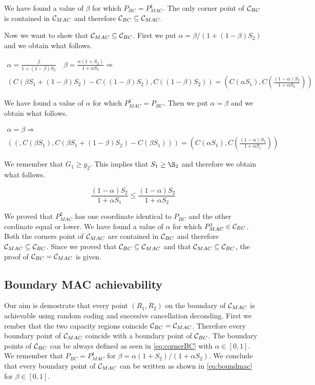 We have found a value of $\beta$ for which $P_{BC} = P_{MAC}^1$. The only corner point of $\mathcal{C}_{BC}$ is contained in $\mathcal{C}_{MAC}$ and therefore $\mathcal{C}_{BC} \subseteq \mathcal{C}_{MAC}$.

Now we want to show that $\mathcal{C}_{MAC} \subseteq \mathcal{C}_{BC}$. First we put $\alpha = \beta / (1+(1-\beta)S_2)$ and we obtain what follows.

\begin{gather*}
	\alpha = \frac{\beta}{1+ (1-\beta) S_2} \quad \beta = \frac{\alpha(1+S_2)}{1+\alpha S_2}  \Rightarrow \\
	\left( C (\beta S_1 + (1-\beta)S_2) - C((1-\beta)S_2) , C \left( (1-\beta)S_2 \right) \right)
	= \left( C(\alpha S_1) , C \left( \frac{(1-\alpha)S_2}{1+\alpha S_2} \right) \right)
\end{gather*}

We have found a value of $\alpha$ for which $P_{MAC}^1 = P_{BC}$. Then we put $\alpha = \beta$ and we obtain what follows.

\begin{gather*}
	\alpha = \beta \Rightarrow \\
	(\left( , C \left(\beta S_1 \right), C (\beta S_1 + (1-\beta)S_2) - C(\beta S_1) \right)) =  \left( C \left(\alpha S_1 \right), C \left( \frac{(1-\alpha)S_2}{1 + \alpha S_1}\right) \right)
\end{gather*}

We remember that $G_1 \geq g_2$. This implies that $S_1 \geq \S_2$ and therefore we obtain what follows.

\begin{equation*}
	\frac{(1-\alpha)S_2}{1 + \alpha S_1} \leq \frac{(1-\alpha)S_2}{1 + \alpha S_2}
\end{equation*}

We proved that $P_{MAC}^2$ has one coordinate identical to $P_{BC}$ and the other cordinate equal or lower. We have found a value of $\alpha$ for which $P_{MAC}^1 \in \mathcal{C}_{BC}$. Both the corners point of $\mathcal{C}_{MAC}$ are contained in $\mathcal{C}_{BC}$ and therefore $\mathcal{C}_{MAC} \subseteq \mathcal{C}_{BC}$. Since we proved that $\mathcal{C}_{BC} \subseteq \mathcal{C}_{MAC}$ and that $\mathcal{C}_{MAC} \subseteq \mathcal{C}_{BC}$, the proof of $\mathcal{C}_{BC}=\mathcal{C}_{MAC}$ is given.

\subsection{Boundary MAC achievability}

Our aim is demostrate that every point $(R_1,R_2)$ on the boundary of $\mathcal{C}_{MAC}$ is achievable using random coding and succesive cancellation deconding. First we rember that the two capacity regions coincide $\mathcal{C}_{BC}=\mathcal{C}_{MAC}$. Therefore every boundary point of $\mathcal{C}_{MAC}$ coincide with a boundary point of $\mathcal{C}_{BC}$. The boundary points of $\mathcal{C}_{BC}$ can be always defined as seen in \eqref{eq:cornerBC} with $\alpha \in [0,1]$. We remember that $P_{BC} = P_{MAC}^1$ for $\beta = \alpha(1+S_2)/(1+\alpha S_2)$. We conclude that every boundary point of $\mathcal{C}_{MAC}$ can be written as shown in \eqref{eq:boundmac} for $\beta \in [0,1]$.

